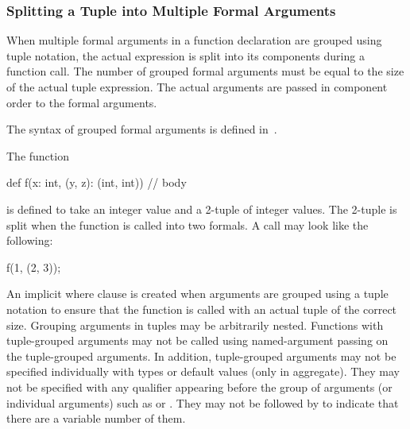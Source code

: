 \subsubsection{Splitting a Tuple into Multiple Formal Arguments}
\label{Formal_Argument_Declarations_in_a_Tuple}

When multiple formal arguments in a function declaration are grouped
using tuple notation, the actual expression is split into its
components during a function call.  The number of grouped formal
arguments must be equal to the size of the actual tuple expression.
The actual arguments are passed in component order to the formal
arguments.

The syntax of grouped formal arguments is defined
in~.

\begin{example}
\begin{chapelpre}
\end{chapelpre}
The function
\begin{chapel}
def f(x: int, (y, z): (int, int)) {
  // body
}
\end{chapel}
is defined to take an integer value and a 2-tuple of integer values.
The 2-tuple is split when the function is called into two formals.  A
call may look like the following:
\begin{chapel}
f(1, (2, 3));
\end{chapel}
\begin{chapelpost}
\end{chapelpost}
\begin{chapeloutput}
\end{chapeloutput}
\end{example}

An implicit where clause is created when arguments are grouped using a
tuple notation to ensure that the function is called with an actual
tuple of the correct size.  Grouping arguments in tuples may be
arbitrarily nested.  Functions with tuple-grouped arguments may not be
called using named-argument passing on the tuple-grouped arguments.
In addition, tuple-grouped arguments may not be specified individually
with types or default values (only in aggregate).  They may not be
specified with any qualifier appearing before the group of arguments
(or individual arguments) such as  or .  They
may not be followed by  to indicate that there are a
variable number of them.

